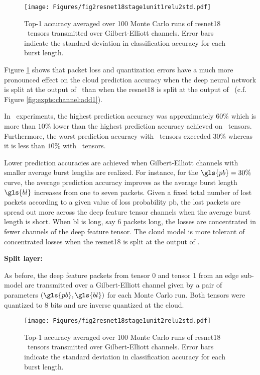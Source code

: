 \begin{figure}[H]
	\centering 
	\texttt{[image: Figures/fig2resnet18stage1unit1relu2std.pdf]}
	\caption[Prediction accuracy with ResNet18 stage 1 unit 1 relu 2 tensors transmitted over Gilbert-Elliott channels]{Top-1 accuracy averaged over 100 Monte Carlo runs of \gls{resnet18} \soneunitonerelutwo~tensors transmitted over Gilbert-Elliott channels. Error bars indicate the standard deviation in classification accuracy for each burst length.} \label{fig:expts:channel:s1u1r2}
\end{figure}

Figure \ref{fig:expts:channel:s1u1r2} shows that packet loss and quantization errors have a much more pronounced effect on the cloud prediction accuracy when the deep neural network is split at the output of \soneunitonerelutwo~than when the \gls{resnet18} is split at the output of \addone~(c.f. Figure \ref{fig:expts:channel:add1}). 

In \soneunitonerelutwo~experiments, the highest prediction accuracy was approximately $60\%$ which is more than $10\%$ lower than the highest prediction accuracy achieved on \addone~tensors. Furthermore, the worst prediction accuracy with \addone~tensors exceeded $30\%$ whereas it is less than $10\%$ with \soneunitonerelutwo~tensors. 

Lower prediction accuracies are achieved when Gilbert-Elliott channels with smaller average burst lengths are realized. For instance, for the $\gls{pb}=30\%$ curve, the average prediction accuracy improves as the average burst length $\gls{bl}$ increases from one to seven packets. Given a fixed total number of lost packets according to a given value of loss probability \gls{pb}, the lost packets are spread out more across the deep feature tensor channels when the average burst length is short. When \gls{bl} is long, say 6 packets long, the losses are concentrated in fewer channels of the deep feature tensor. The cloud model is more tolerant of concentrated losses when the \gls{resnet18} is split at the output of \soneunitonerelutwo.

\textbf{Split layer:} \soneunittworelutwo

As before, the deep feature packets from tensor 0 and tensor 1 from an edge sub-model are transmitted over a Gilbert-Elliott channel given by a pair of parameters $(\gls{pb},\gls{bl})$ for each Monte Carlo run. Both tensors were quantized to 8 bits and are inverse quantized at the cloud.

\begin{figure}[H]
	\centering 
	\texttt{[image: Figures/fig2resnet18stage1unit2relu2std.pdf]}
	\caption[Prediction accuracy with ResNet18 stage 1 unit 2 relu 2 tensors transmitted over Gilbert-Elliott channels]{Top-1 accuracy averaged over 100 Monte Carlo runs of \gls{resnet18} \soneunittworelutwo~tensors transmitted over Gilbert-Elliott channels. Error bars indicate the standard deviation in classification accuracy for each burst length.} \label{fig:expts:channel:s1u2r2}
\end{figure}

